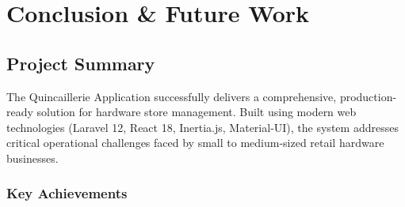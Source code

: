 \section{Conclusion \& Future Work}

\subsection{Project Summary}

The Quincaillerie Application successfully delivers a comprehensive, production-ready solution for hardware store management. Built using modern web technologies (Laravel 12, React 18, Inertia.js, Material-UI), the system addresses critical operational challenges faced by small to medium-sized retail hardware businesses.

\subsubsection{Key Achievements}

